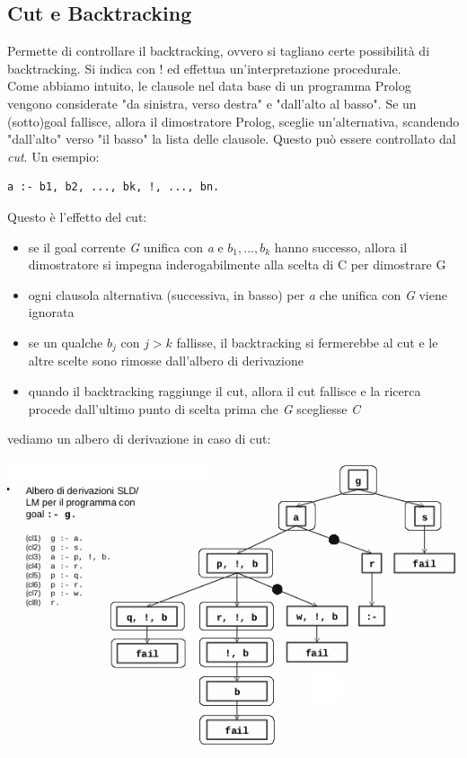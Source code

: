 \documentclass[a4paper,12pt, oneside]{book}
\begin{document}
\subsection{Cut e Backtracking}
Permette di controllare il backtracking, ovvero si tagliano certe possibilità di backtracking. Si indica con $!$ ed effettua un'interpretazione procedurale. \\
Come abbiamo intuito, le clausole nel data base di un programma
Prolog vengono considerate "da sinistra, verso destra" e "dall'alto al
basso". Se un (sotto)goal fallisce, allora il dimostratore Prolog, sceglie un'alternativa, scandendo "dall'alto" verso "il basso" la lista delle clausole. Questo può essere controllato dal \textit{cut}. Un esempio:
\begin{verbatim}
a :- b1, b2, ..., bk, !, ..., bn.
\end{verbatim}
Questo è l'effetto del cut:
\begin{itemize}
\item se il goal corrente \textit{G} unifica con \textit{a} e $b_1,...,b_k$ hanno successo, allora il dimostratore si impegna inderogabilmente alla scelta di C per dimostrare G
\item ogni clausola alternativa (successiva, in basso) per \textit{a} che unifica con \textit{G} viene ignorata
\item se un qualche $b_j$ con $j > k$ fallisse, il backtracking si fermerebbe al cut e le altre scelte sono rimosse dall'albero di derivazione
\item quando il backtracking raggiunge il cut, allora il cut fallisce e la ricerca procede dall'ultimo punto di scelta prima che \textit{G} scegliesse \textit{C}
\end{itemize}
vediamo un albero di derivazione in caso di cut:
\begin{center}
	\includegraphics[scale=0.8]{img/cut.png}
\end{center}
\end{document}
